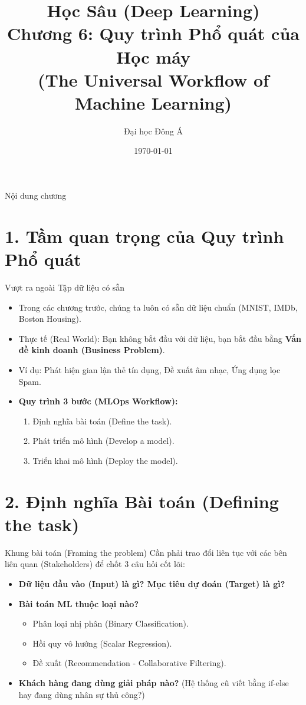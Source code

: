 \documentclass[aspectratio=169]{beamer}
\title[Chương 6: Quy trình ML]{Học Sâu (Deep Learning) \\ \vspace{0.5cm} \Large Chương 6: Quy trình Phổ quát của Học máy \\ (The Universal Workflow of Machine Learning)}
\author{Đại học Đông Á}
\date{\today}
\begin{document}
\begin{frame}
    \titlepage
\end{frame}

\begin{frame}{Nội dung chương}
    \tableofcontents
\end{frame}

\section{1. Tầm quan trọng của Quy trình Phổ quát}

\begin{frame}{Vượt ra ngoài Tập dữ liệu có sẵn}
    \begin{itemize}
        \item Trong các chương trước, chúng ta luôn có sẵn dữ liệu chuẩn (MNIST, IMDb, Boston Housing).
        \item Thực tế (Real World): Bạn không bắt đầu với dữ liệu, bạn bắt đầu bằng \textbf{Vấn đề kinh doanh (Business Problem)}.
        \item Ví dụ: Phát hiện gian lận thẻ tín dụng, Đề xuất âm nhạc, Ứng dụng lọc Spam.
        \item \textbf{Quy trình 3 bước (MLOps Workflow):}
        \begin{enumerate}
            \item Định nghĩa bài toán (Define the task).
            \item Phát triển mô hình (Develop a model).
            \item Triển khai mô hình (Deploy the model).
        \end{enumerate}
    \end{itemize}
\end{frame}

\section{2. Định nghĩa Bài toán (Defining the task)}

\begin{frame}{Khung bài toán (Framing the problem)}
    Cần phải trao đổi liên tục với các bên liên quan (Stakeholders) để chốt 3 câu hỏi cốt lõi:
    \begin{itemize}
        \item \textbf{Dữ liệu đầu vào (Input) là gì? Mục tiêu dự đoán (Target) là gì?}
        \item \textbf{Bài toán ML thuộc loại nào?}
        \begin{itemize}
            \item Phân loại nhị phân (Binary Classification).
            \item Hồi quy vô hướng (Scalar Regression).
            \item Đề xuất (Recommendation - Collaborative Filtering).
        \end{itemize}
        \item \textbf{Khách hàng đang dùng giải pháp nào?} (Hệ thống cũ viết bằng if-else hay đang dùng nhân sự thủ công?)
    \end{itemize}
\end{frame}
\end{document}
